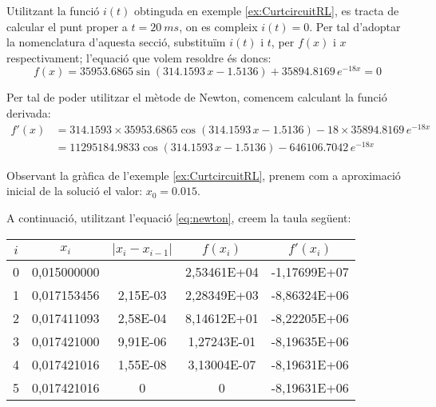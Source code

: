 \begin{exemple}\label{ex:SolFunNoLin}
	\addcontentsxms{\SolFunNoLin}	
    Utilitzant la funció $i(t)$ obtinguda en exemple \vref{ex:CurtcircuitRL}, es tracta de calcular el punt proper a $t = \qty{20}{ms}$, on es compleix $i(t)=0$. Per tal d'adoptar la nomenclatura d'aquesta secció, substituïm $i(t)$ i $t$, per $f(x)$ i $x$ respectivament; l'equació que volem resoldre és doncs:
    \[
        f(x) = \num{35953,6865}\sin(\num{314,1593}\,x-\num{1,5136}) + \num{35894,8169}\,e^{-18 x} = 0
    \]

    Per tal de poder utilitzar el mètode de Newton, comencem calculant la funció derivada:
    \begin{align*}
        f'(x) &= \num{314,1593}\times\num{35953,6865}\cos(\num{314,1593}\,x-\num{1,5136}) -18\times \num{35894,8169}\,e^{-18 x} \\
        {} &= \num{11295184,9833}\cos(\num{314,1593}\,x-\num{1,5136}) - \num{646106,7042}\,e^{-18 x}
    \end{align*}

    Observant la gràfica de l'exemple \ref{ex:CurtcircuitRL}, prenem com a  aproximació inicial de la solució el valor: $x_0 = \num{0,015}$.

    A continuació, utilitzant l'equació \eqref{eq:newton}, creem la taula següent:

\begin{center}
   \centering
   \begin{tabular}{S[table-format=1.0]S[table-format=2.9]S[table-format=2.2e+2]
   S[table-format=2.5e+2]S[table-format=+3.5e+2]}
    & {$x_i$}  & {$|x_i - x_{i-1}|$} & {$f(x_i)$} & {$f'(x_i)$} \\
    &	0,015000000 &	{}       & 2,53461E+04	& -1,17699E+07 \\
        1 &	0,017153456 &	2,15E-03 & 2,28349E+03	& -8,86324E+06 \\	
        2 &	0,017411093 &	2,58E-04 & 8,14612E+01	& -8,22205E+06 \\	
        3 &	0,017421000 &	9,91E-06 & 1,27243E-01	& -8,19635E+06 \\	
        4 &	0,017421016 &	1,55E-08 & 3,13004E-07	& -8,19631E+06 \\	
        5 &	0,017421016 &	0        & 0           	& -8,19631E+06 \\	
   \bottomrule[1pt]
   \end{tabular}
\end{center}


\end{exemple}
